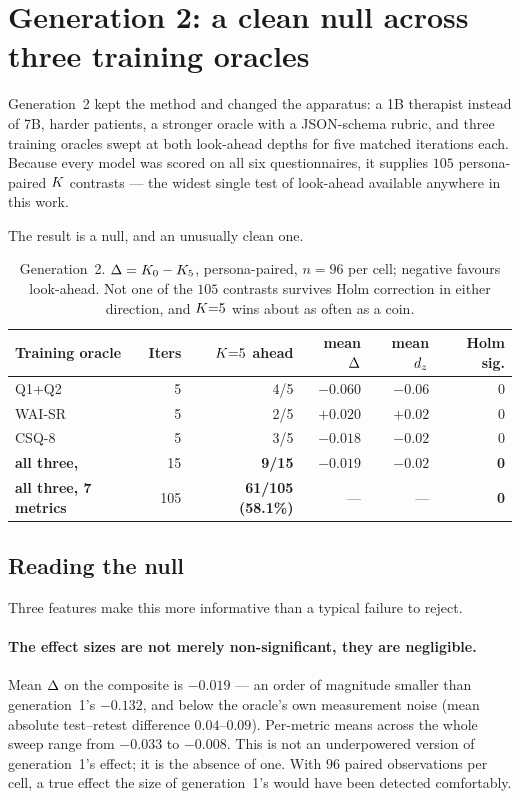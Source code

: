 \section{Generation 2: a clean null across three training oracles}
\label{sec:gen2}

Generation~2 kept the method and changed the apparatus: a 1B therapist instead of 7B, harder
patients, a stronger oracle with a JSON-schema rubric, and three training oracles swept at both
look-ahead depths for five matched iterations each. Because every model was scored on all six
questionnaires, it supplies $105$ persona-paired $K$ contrasts --- the widest single test of
look-ahead available anywhere in this work.

The result is a null, and an unusually clean one.

\begin{table}[t]
\centering\small
\begin{tabular}{@{}lrrrrr@{}}
\toprule
\textbf{Training oracle} & \textbf{Iters} & $K{=}5$ \textbf{ahead} & \textbf{mean} $\Delta$ & \textbf{mean} $d_z$ & \textbf{Holm sig.} \\
\midrule
Q1{+}Q2 & 5 & 4/5 & $-0.060$ & $-0.06$ & 0 \\
WAI-SR  & 5 & 2/5 & $+0.020$ & $+0.02$ & 0 \\
CSQ-8   & 5 & 3/5 & $-0.018$ & $-0.02$ & 0 \\
\midrule
\textbf{all three, \QQ{}} & 15 & \textbf{9/15} & $\mathbf{-0.019}$ & $-0.02$ & \textbf{0} \\
\textbf{all three, 7 metrics} & 105 & \textbf{61/105 (58.1\%)} & --- & --- & \textbf{0} \\
\bottomrule
\end{tabular}
\caption{Generation~2. $\Delta = K_0 - K_5$, persona-paired, $n = 96$ per cell; negative
favours look-ahead. Not one of the $105$ contrasts survives Holm correction in either
direction, and $K{=}5$ wins about as often as a coin.}
\label{tab:gen2}
\end{table}

\subsection{Reading the null}
Three features make this more informative than a typical failure to reject.

\paragraph{The effect sizes are not merely non-significant, they are negligible.}
Mean $\Delta$ on the \QQ{} composite is $-0.019$ --- an order of magnitude smaller than
generation~1's $-0.132$, and below the oracle's own measurement noise (mean absolute
test--retest difference $0.04$--$0.09$). Per-metric means across the whole sweep range from
$-0.033$ to $-0.008$. This is not an underpowered version of generation~1's effect; it is the
absence of one. With $96$ paired observations per cell, a true effect the size of
generation~1's would have been detected comfortably.


